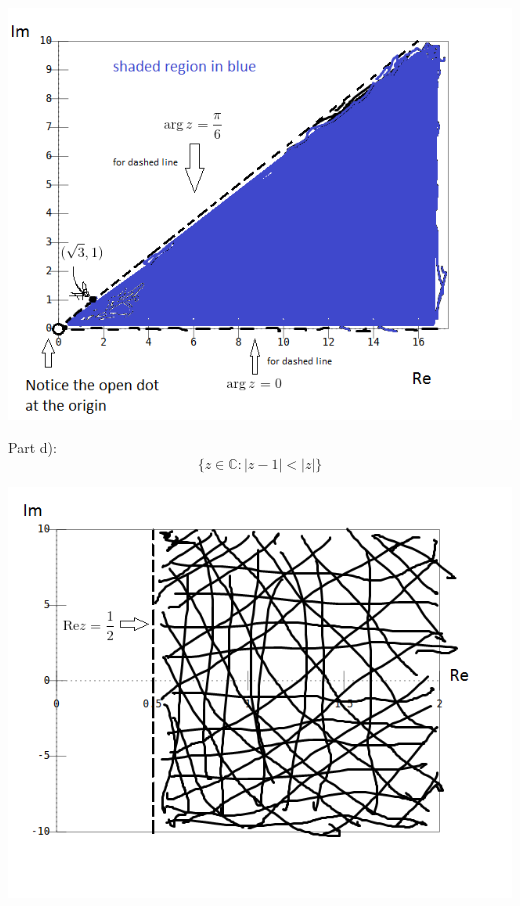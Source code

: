 \documentclass[12pt]{article}
\newcommand{\C}{\mathbb{C}}
\begin{document}
\includegraphics[scale=0.9]{q1c}

\newpage
Part d): 
$$\{z\in\C: |z-1|<|z|\}$$

\includegraphics[scale=0.9]{q1d}
\end{document}

